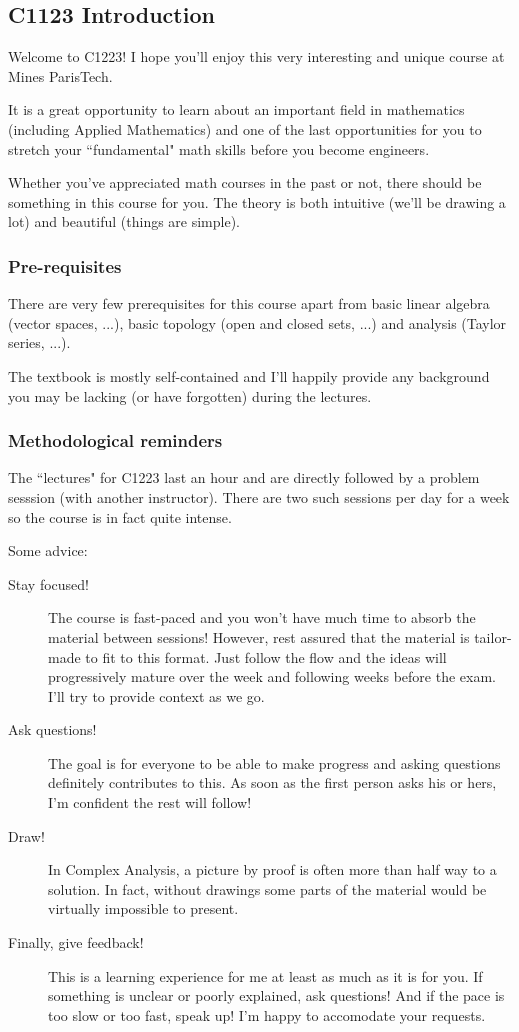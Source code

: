 \subsection{C1123 Introduction}
Welcome to C1223! I hope you'll enjoy this very interesting and unique course at Mines ParisTech.

It is a great opportunity to learn about an important field in mathematics (including Applied Mathematics) and one of the last opportunities for you to stretch your ``fundamental" math skills before you become engineers.

Whether you've appreciated math courses in the past or not, there should be something in this course for you. The theory is both intuitive (we'll be drawing a lot) and beautiful (things are simple).
\subsubsection{Pre-requisites}
There are very few prerequisites for this course apart from basic linear algebra (vector spaces, ...), basic topology (open and closed sets, ...) and analysis (Taylor series, ...).

The textbook is mostly self-contained and I'll happily provide any background you may be lacking (or have forgotten) during the lectures.

\subsubsection{Methodological reminders}
The ``lectures" for C1223 last an hour and are directly followed by a problem sesssion (with another instructor). There are two such sessions per day for a week so the course is in fact quite intense.

Some advice:
\begin{description}
    \item[Stay focused!] The course is fast-paced and you won't have much time to absorb the material between sessions! However, rest assured that the material is tailor-made to fit to this format. Just follow the flow and the ideas will progressively mature over the week and following weeks before the exam. I'll try to provide context as we go. 
    \item [Ask questions!] The goal is for everyone to be able to make progress and asking questions definitely contributes to this. As soon as the first person asks his or hers, I'm confident the rest will follow!
    \item [Draw!] In Complex Analysis, a picture by proof is often more than half way to a solution. In fact, without drawings some parts of the material would be virtually impossible to present. 
    \item [Finally, give feedback!] This is a learning experience for me at least as much as it is for you. If something is unclear or poorly explained, ask questions! And if the pace is too slow or too fast, speak up! I'm happy to accomodate your requests.
\end{description}

